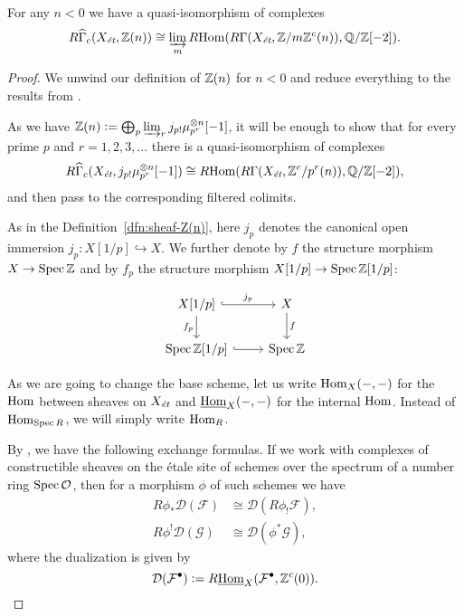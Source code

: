 \documentclass{article}
\numberwithin{equation}{section}
\begin{document}
\begin{proposition}
  For any $n < 0$ we have a quasi-isomorphism of complexes
  \begin{equation}
    \label{eqn:duality-quasi-isomorphism-1}
    R\widehat{\Gamma}_c (X_\et, \ZZ (n)) \cong
    \varinjlim_m \RHom (R\Gamma (X_\et, \ZZ/m\ZZ^c (n)), \QQ/\ZZ [-2]).
  \end{equation}

  \begin{proof}
    We unwind our definition of $\ZZ (n)$ for $n < 0$ and reduce everything to
    the results from \cite{Geisser-2010}.

    \vspace{1em}

    As we have
    $\ZZ (n) \dfn \bigoplus_p \varinjlim_r j_{p!} \mu_{p^r}^{\otimes n} [-1]$,
    it will be enough to show that for every prime $p$ and $r=1,2,3,\ldots$
    there is a quasi-isomorphism of complexes
    \[ R\widehat{\Gamma}_c (X_\et, j_{p!} \mu_{p^r}^{\otimes n} [-1]) \cong
    \RHom (R\Gamma (X_\et, \ZZ^c/p^r (n)), \QQ/\ZZ [-2]), \]
    and then pass to the corresponding filtered colimits.

    As in the Definition~\ref{dfn:sheaf-Z(n)}, here $j_p$ denotes the canonical
    open immersion $j_p\colon X[1/p] \hookrightarrow X$. We further denote by
    $f$ the structure morphism $X\to \Spec \ZZ$ and by $f_p$ the structure
    morphism $X [1/p] \to \Spec \ZZ [1/p]$:

    \[ \begin{tikzcd}
      X [1/p]\ar[hookrightarrow]{r}{j_p}\ar{d}[swap]{f_p} & X\ar{d}{f} \\
      \Spec \ZZ [1/p]\ar[hookrightarrow]{r} & \Spec \ZZ
    \end{tikzcd} \]

    As we are going to change the base scheme, let us write $\Hom_X (-,-)$ for
    the $\Hom$ between sheaves on $X_\et$ and $\iHom_X (-,-)$ for the
    internal $\Hom$. Instead of $\Hom_{\Spec R}$, we will simply write
    $\Hom_R$.

    By \cite[Proposition 7.10, (c)]{Geisser-2010}, we have the following
    exchange formulas. If we work with complexes of constructible sheaves on the
    étale site of schemes over the spectrum of a number ring
    $\Spec\mathcal{O}$, then for a morphism $\phi$ of such schemes we have
    \begin{align}
      \label{eqn:exchange-formula-1} R \phi_* \mathcal{D} (\mathcal{F}) & \cong \mathcal{D} (R \phi_! \mathcal{F}),\\
      \label{eqn:exchange-formula-2} R \phi^! \mathcal{D} (\mathcal{G}) & \cong \mathcal{D} (\phi^* \mathcal{G}),
    \end{align}
    where the dualization is given by
    \[ \mathcal{D} (\mathcal{F}^\bullet) \dfn
    R\iHom_X (\mathcal{F}^\bullet, \ZZ^c (0)). \]


\end{proof}
\end{proposition}
\end{document}
